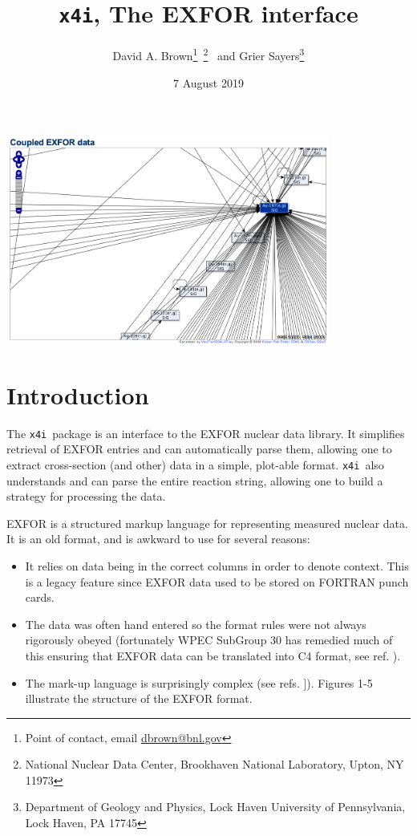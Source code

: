 \documentclass[11pt]{article}
\newcommand{\xfouri}{\texttt{x4i}}
\begin{document}
\title{\xfouri, The EXFOR interface}
\author{David A. Brown\footnote{Point of contact, email \url{dbrown@bnl.gov}}\ \footnote{National Nuclear Data Center, Brookhaven National Laboratory, Upton, NY 11973} \ and Grier Sayers\footnote{Department of Geology and Physics, Lock Haven University of Pennsylvania, Lock Haven, PA 17745}}
\date{7 August 2019}
\maketitle
\begin{center}
\includegraphics[width=0.8\textwidth]{figs/vis.png}
\end{center}

\tableofcontents

\section{Introduction}
The \xfouri\ package is an interface to the EXFOR nuclear data library.  It simplifies retrieval of EXFOR entries and can automatically parse them, allowing one to extract cross-section (and other) data in a simple, plot-able format.  \xfouri\ also understands and can parse the entire reaction string, allowing one to build a strategy for processing the data.

EXFOR is a structured markup language for representing measured nuclear data.  It is an old format, and is awkward to use for several reasons:\begin{itemize}
\item  It relies on data being in the correct columns in order to denote context.  This is a legacy feature since EXFOR data used to be stored on FORTRAN punch cards.
\item The data was often hand entered so the format rules were not always rigorously obeyed (fortunately WPEC SubGroup 30 has remedied much of this ensuring that EXFOR data can  be translated into C4 format, see ref. \cite{1}).
\item The mark-up language is surprisingly complex (see refs. \cite{2,3,4,5}]).   Figures 1-5 illustrate the structure of the EXFOR format.
\end{itemize}
\end{document}

